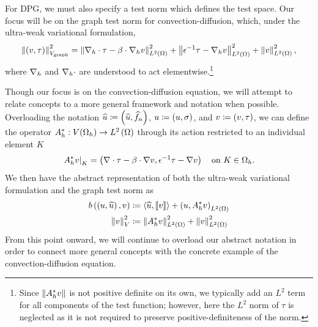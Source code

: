 %

For DPG, we must also specify a test norm which defines the test space.  Our focus will be on the graph test norm for convection-diffusion, which, under the ultra-weak variational formulation, 
\[
\nor{\LRp{v,\tau}}_{V_{\rm graph}}^2 = \nor{\grad_h\cdot\tau - \beta \cdot \grad_h v}_{L^2(\Omega)}^2 + \nor{{\epsilon}^{-1} \tau -  \grad_h v}_{L^2(\Omega)}^2 + \nor{v}_{L^2(\Omega)}^2, 
\]
where $\grad_h$ and $\grad_h\cdot$ are understood to act elementwise.\footnote{Since $\nor{A^*_hv}$ is not positive definite on its own, we typically add an $L^2$ term for all components of the test function; however, here the $L^2$ norm of $\tau$ is neglected as it is not required to preserve positive-definiteness of the norm.}

Though our focus is on the convection-diffusion equation, we will attempt to relate concepts to a more general framework and notation when possible.  Overloading the notation $\uh \coloneqq \LRp{\uh,\fnh}$, $u \coloneqq \LRp{u,\sigma}$, and $v \coloneqq \LRp{v,\tau}$, we can define the operator $A_h^*: V(\Oh)\rightarrow \L$ through its action restricted to an individual element $K$
\[
\left.A_h^*v\right|_K = \LRp{\div\tau - \beta \cdot \grad v, {\epsilon}^{-1} \tau -  \grad v} \quad \text{on } K \in \Oh.
\]
We then have the abstract representation of both the ultra-weak variational formulation and the graph test norm as
\begin{align*}
b\LRp{\LRp{u,\uh},v} &\coloneqq \LRa{\uh,\jump{v}} + \LRp{u,A^*_h v}_{\L} \\
\nor{v}_V^2 &\coloneqq \nor{A_h^*v}_{\L}^2 + \nor{v}_{\L}^2
\end{align*}
From this point onward, we will continue to overload our abstract notation in order to connect more general concepts with the concrete example of the convection-diffusion equation.

